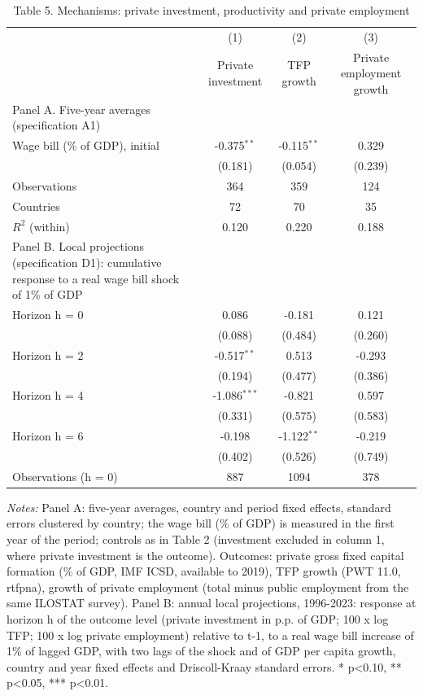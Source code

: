 \begin{table}[htbp]\centering\footnotesize
\providecommand{\sym}[1]{\ensuremath{^{#1}}}
\caption{Table 5. Mechanisms: private investment, productivity and private employment}\label{tab:Table5_mechanisms}
\begin{tabular}{l*{3}{c}}
\toprule
 & (1) & (2) & (3) \\
 & Private investment & TFP growth & Private employment growth \\
\midrule
Panel A. Five-year averages (specification A1) &  &  &  \\
Wage bill (\% of GDP), initial & -0.375\sym{**} & -0.115\sym{**} & 0.329 \\
 & (0.181) & (0.054) & (0.239) \\
Observations & 364 & 359 & 124 \\
Countries & 72 & 70 & 35 \\
$R^2$ (within) & 0.120 & 0.220 & 0.188 \\
\midrule
Panel B. Local projections (specification D1): cumulative response to a real wage bill shock of 1\% of GDP &  &  &  \\
Horizon h = 0 & 0.086 & -0.181 & 0.121 \\
 & (0.088) & (0.484) & (0.260) \\
Horizon h = 2 & -0.517\sym{**} & 0.513 & -0.293 \\
 & (0.194) & (0.477) & (0.386) \\
Horizon h = 4 & -1.086\sym{***} & -0.821 & 0.597 \\
 & (0.331) & (0.575) & (0.583) \\
Horizon h = 6 & -0.198 & -1.122\sym{**} & -0.219 \\
 & (0.402) & (0.526) & (0.749) \\
Observations (h = 0) & 887 & 1094 & 378 \\
\bottomrule
\end{tabular}
\begin{minipage}{0.95\linewidth}\vspace{4pt}\scriptsize \textit{Notes:} Panel A: five-year averages, country and period fixed effects, standard errors clustered by country; the wage bill (\% of GDP) is measured in the first year of the period; controls as in Table 2 (investment excluded in column 1, where private investment is the outcome). Outcomes: private gross fixed capital formation (\% of GDP, IMF ICSD, available to 2019), TFP growth (PWT 11.0, rtfpna), growth of private employment (total minus public employment from the same ILOSTAT survey). Panel B: annual local projections, 1996-2023: response at horizon h of the outcome level (private investment in p.p. of GDP; 100 x log TFP; 100 x log private employment) relative to t-1, to a real wage bill increase of 1\% of lagged GDP, with two lags of the shock and of GDP per capita growth, country and year fixed effects and Driscoll-Kraay standard errors. * p<0.10, ** p<0.05, *** p<0.01.\end{minipage}
\end{table}

